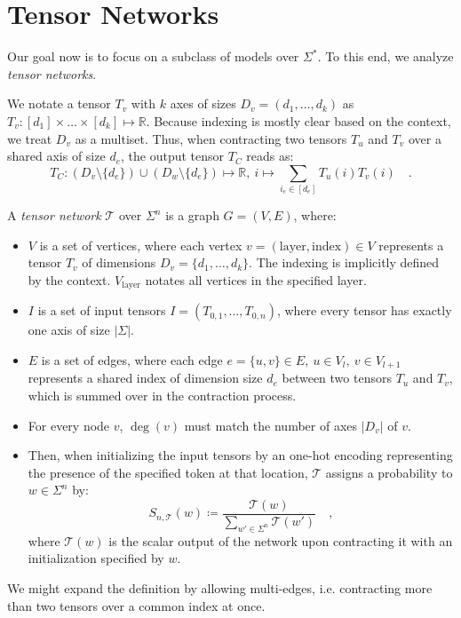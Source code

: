\documentclass[../../main.tex]{subfiles}
\begin{document}
\section{Tensor Networks}
    Our goal now is to focus on a subclass of models over $\Sigma^*$. To this end, we analyze \emph{tensor networks}.

    We notate a tensor $T_v$ with $k$ axes of sizes $D_v = (d_1, \dots, d_k)$ as $T_v: [d_1] \times \dots \times [d_k] \mapsto \mathbb{R}$. Because indexing is mostly clear based on the context, we treat $D_v$ as a multiset. Thus, when contracting two tensors $T_u$ and $T_v$ over a shared axis of size $d_e$, the output tensor $T_C$ reads as:
    \[
        T_C: (D_v \setminus \{d_e\}) \cup (D_w \setminus \{d_e\}) \mapsto \mathbb{R}, \ i \mapsto \sum_{i_e \in [d_e]} T_u(i) T_v(i) \quad .
    \]

    \begin{definition}
    A \emph{tensor network} \( \mathcal{T} \) over $\Sigma^n$ is a graph \( G = (V, E) \), where:
    \begin{itemize}
        \item \( V \) is a set of vertices, where each vertex \( v = (\text{layer}, \text{index}) \in V \) represents a tensor \( T_v \) of dimensions $D_v = \{d_1, \dots, d_k\}$. The indexing is implicitly defined by the context. $V_{\text{layer}}$ notates all vertices in the specified layer.
        \item $I$ is a set of input tensors $I = (T_{0, 1}, \dots, T_{0, n})$, where every tensor has exactly one axis of size $|\Sigma|$.
        \item \( E \) is a set of edges, where each edge \( e = \{u, v\} \in E, \ u \in V_l, \ v \in V_{l+1} \) represents a shared index of dimension size $d_e$ between two tensors \( T_u \) and \( T_v \), which is summed over in the contraction process.
        \item For every node $v$, $\deg(v)$ must match the number of axes $|D_v|$ of $v$.
        \item Then, when initializing the input tensors by an one-hot encoding representing the presence of the specified token at that location, $\mathcal{T}$ assigns a probability to $w \in \Sigma^n$ by:
        \[
            S_{n, \mathcal{T}}(w) \coloneqq \dfrac{\mathcal{T}(w)}{\sum_{w' \in \Sigma^n} \mathcal{T}(w')} \quad ,
        \]
        where $\mathcal{T}(w)$ is the scalar output of the network upon contracting it with an initialization specified by $w$.
    \end{itemize}
    \end{definition}

    \begin{remark}
        We might expand the definition by allowing multi-edges, i.e. contracting more than two tensors over a common index at once.
    \end{remark}
\end{document}

